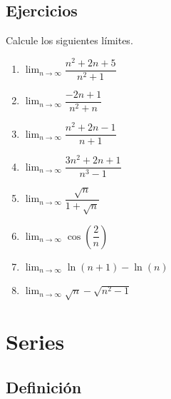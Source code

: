\subsection{Ejercicios}
\begin{frame}
\subsectionpage
\end{frame}


\begin{frame}
  Calcule los siguientes límites.\\[0.25cm]
  \begin{enumerate}
    \item $\displaystyle\lim_{n\to\infty}\dfrac{n^2+2n+5}{n^2+1}$\\
    \item $\displaystyle\lim_{n\to\infty}\dfrac{-2n+1}{n^2+n}$\\
    \item $\displaystyle\lim_{n\to\infty}\dfrac{n^2+2n-1}{n+1}$\\
    \item $\displaystyle\lim_{n\to\infty}\dfrac{3n^2+2n+1}{n^3-1}$\\
    \item $\displaystyle\lim_{n\to\infty}\dfrac{\sqrt{n}}{1+\sqrt{n}}$\\
    \item $\displaystyle\lim_{n\to\infty}\cos\left(\dfrac{2}{n}\right)$\\
    \item $\displaystyle\lim_{n\to\infty}\ln(n+1)-\ln(n)$\\
    \item $\displaystyle\lim_{n\to\infty}\sqrt{n}-\sqrt{n^2-1}$
  \end{enumerate}
\end{frame}

\section{Series}
\begin{frame}
\sectionpage
\end{frame}

\begin{frame}
\tableofcontents[currentsection]
\end{frame}

\subsection{Definición}
\begin{frame}
\subsectionpage
\end{frame}


